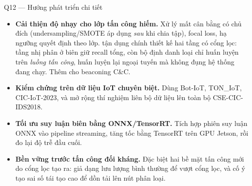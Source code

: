 \documentclass[aspectratio=169, 11pt]{beamer}
\begin{document}
\begin{frame}[label=bk-future]{Q12 --- Hướng phát triển chi tiết}
  \begin{itemize}\small
    \item \textbf{Cải thiện độ nhạy cho lớp tấn công hiếm.} Xử lý mất cân bằng
          có chủ đích (undersampling/SMOTE áp dụng \emph{sau} khi chia tập),
          focal loss, hạ ngưỡng quyết định theo lớp. 
          tận dụng chính thiết kế hai tầng có cổng lọc: tầng nhị phân ở biên giữ recall
          tổng, còn bộ định danh loại chỉ huấn luyện trên \emph{luồng tấn công},
          huấn luyện lại ngoại tuyến mà không đụng hệ thống đang chạy. Thêm
           cho beaconing C\&C.
    \item \textbf{Kiểm chứng trên dữ liệu IoT chuyên biệt.} Dùng Bot-IoT, TON\_IoT,
          CIC-IoT-2023, và mở rộng thí nghiệm liên bộ dữ liệu lên toàn bộ
          CSE-CIC-IDS2018.
    \item \textbf{Tối ưu suy luận biên bằng ONNX/TensorRT.} Tích hợp phiên suy
          luận ONNX vào pipeline streaming, tăng tốc bằng TensorRT trên GPU
          Jetson, rồi đo lại độ trễ đầu cuối.
    \item \textbf{Bền vững trước tấn công đối kháng.} Đặc biệt hai bề mặt tấn
          công mới do cổng lọc tạo ra: giả dạng lưu lượng bình thường để vượt cổng lọc,
          và cố ý tạo sai số tái tạo cao để dồn tải lên nút phân loại.
  \end{itemize}
\end{frame}
\end{document}
